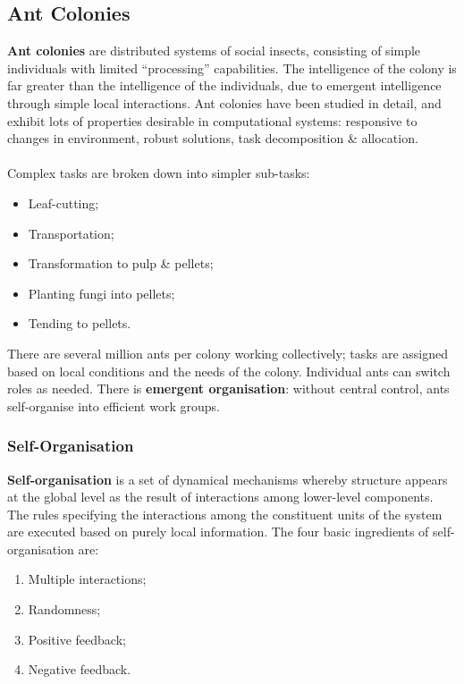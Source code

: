 \documentclass[a4paper,11pt]{article}
\begin{document}
\subsection{Ant Colonies}
\textbf{Ant colonies} are distributed systems of social insects, consisting of simple individuals with limited ``processing'' capabilities.
The intelligence of the colony is far greater than the intelligence of the individuals, due to emergent intelligence through simple local interactions.
Ant colonies have been studied in detail, and exhibit lots of properties desirable in computational systems:
responsive to changes in environment, robust solutions, task decomposition \& allocation.
\\\\
Complex tasks are broken down into simpler sub-tasks:
\begin{itemize}
    \item   Leaf-cutting;
    \item   Transportation;
    \item   Transformation to pulp \& pellets;
    \item   Planting fungi into pellets;
    \item   Tending to pellets.
\end{itemize}

There are several million ants per colony working collectively;
tasks are assigned based on local conditions and the needs of the colony.
Individual ants can switch roles as needed.
There is \textbf{emergent organisation}: without central control, ants self-organise into efficient work groups.

\subsubsection{Self-Organisation}
\textbf{Self-organisation} is a set of dynamical mechanisms whereby structure appears at the global level as the result of interactions among lower-level components.
The rules specifying the interactions among the constituent units of the system are executed based on purely local information.
The four basic ingredients of self-organisation are:
\begin{enumerate}
    \item   Multiple interactions;
    \item   Randomness;
    \item   Positive feedback;
    \item   Negative feedback.
\end{enumerate}
\end{document}
